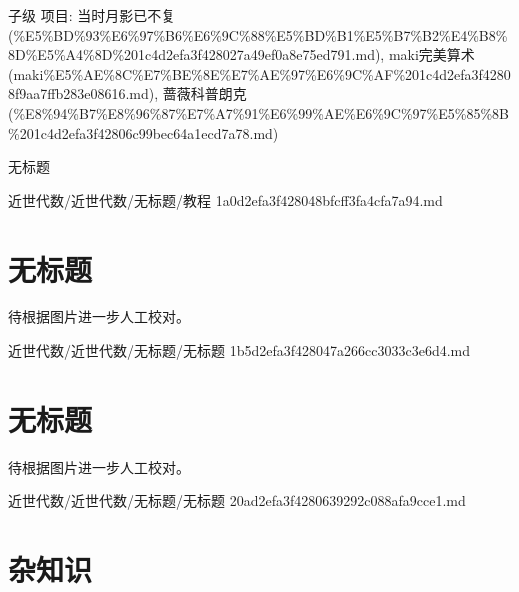 \begin{note}[教程]

子级 项目: 当时月影已不复 (\%E5\%BD\%93\%E6\%97\%B6\%E6\%9C\%88\%E5\%BD\%B1\%E5\%B7\%B2\%E4\%B8\%8D\%E5\%A4\%8D\%201c4d2efa3f428027a49ef0a8e75ed791.md), maki完美算术 (maki\%E5\%AE\%8C\%E7\%BE\%8E\%E7\%AE\%97\%E6\%9C\%AF\%201c4d2efa3f42808f9aa7ffb283e08616.md), 蔷薇科普朗克 (\%E8\%94\%B7\%E8\%96\%87\%E7\%A7\%91\%E6\%99\%AE\%E6\%9C\%97\%E5\%85\%8B\%201c4d2efa3f42806c99bec64a1ecd7a78.md)

无标题

\end{note}

\begin{note}[来源路径]

近世代数/近世代数/无标题/教程 1a0d2efa3f428048bfcff3fa4cfa7a94.md

\end{note}

\section*{无标题}

\begin{note}[无标题]

待根据图片进一步人工校对。

\end{note}

\begin{note}[来源路径]

近世代数/近世代数/无标题/无标题 1b5d2efa3f428047a266cc3033c3e6d4.md

\end{note}

\section*{无标题}

\begin{note}[无标题]

待根据图片进一步人工校对。

\end{note}

\begin{note}[来源路径]

近世代数/近世代数/无标题/无标题 20ad2efa3f4280639292c088afa9cce1.md

\end{note}

\section*{杂知识}

